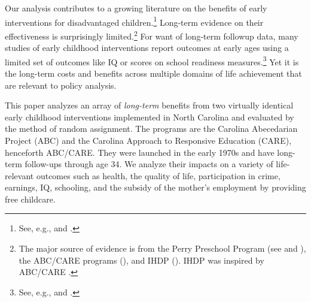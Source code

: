 Our analysis contributes to a growing literature on the benefits of early interventions for disadvantaged children.\footnote{See, e.g., \cite{Currie_2011_AER} and \cite{Elango_Hojman_etal_2016_Early-Edu}.} Long-term evidence on their effectiveness is surprisingly limited.\footnote{The major source of evidence is from the Perry Preschool Program (see \citealp{Schweinhart_Montie_ea_2005_BOOKlifetime} and \citealp{Heckman_Moon_etal_2010_RateofReturn,Heckman_Moon_etal_2010_QE}), the ABC/CARE programs (\citealp{Ramey_Campbell_etal_2000_ADS,Ramey-etal_2012-ABC}), and IHDP (\citealp{Gross_Spiker_etal_1997_BOOKHelpinglowbirth,Duncan_Sojourner_2013_JHR}). IHDP was inspired by ABC/CARE \citep[][]{Gross_Spiker_etal_1997_BOOKHelpinglowbirth}.} For want of long-term followup data, many studies of early childhood interventions report outcomes at early ages using a limited set of outcomes like IQ or scores on school readiness measures.\footnote{See, e.g., \cite{Kline_Walters_2014_EvaluatingPublicPrograms} and \cite{Weiland_2013_CD_Impacts-of-Pre-K}.} Yet it is the long-term costs and benefits across multiple domains of life achievement that are relevant to policy analysis.

This paper analyzes an array of \emph{long-term} benefits from two virtually identical early childhood interventions implemented in North Carolina and evaluated by the method of random assignment. The programs are the Carolina Abecedarian Project (ABC) and the Carolina Approach to Responsive Education (CARE), henceforth ABC/CARE. They were launched in the early 1970s and have long-term follow-ups through age 34. We analyze their impacts on a variety of life-relevant outcomes such as health, the quality of life, participation in crime, earnings, IQ, schooling, and the subsidy of the mother's employment by providing free childcare.

